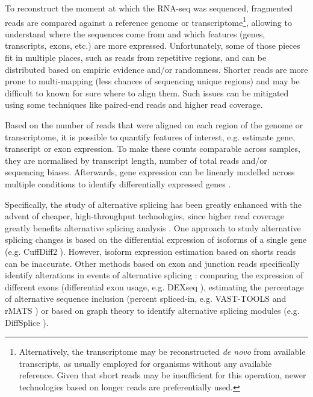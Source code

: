 To reconstruct the moment at which the RNA-seq was sequenced, fragmented reads are compared against a reference genome or transcriptome\footnote{Alternatively, the transcriptome may be reconstructed \emph{de novo} from available transcripts, as usually employed for organisms without any available reference. Given that short reads may be insufficient for this operation, newer technologies based on longer reads are preferentially used.}, allowing to understand where the sequences come from and which features (genes, transcripts, exons, etc.) are more expressed. Unfortunately, some of those pieces fit in multiple places, such as reads from repetitive regions, and can be distributed based on empiric evidence and/or randomness. Shorter reads are more prone to multi-mapping (less chances of sequencing unique regions) and may be difficult to known for sure where to align them. Such issues can be mitigated using some techniques like paired-end reads and higher read coverage.

Based on the number of reads that were aligned on each region of the genome or transcriptome, it is possible to quantify features of interest, e.g. estimate gene, transcript or exon expression. To make these counts comparable across samples, they are normalised by transcript length, number of total reads and/or sequencing biases. Afterwards, gene expression can be linearly modelled across multiple conditions to identify differentially expressed genes \cite{conesa:2016vw}.

Specifically, the study of alternative splicing has been greatly enhanced with the advent of cheaper, high-throughput technologies, since higher read coverage greatly benefits alternative splicing analysis \cite{}. %
One approach to study alternative splicing changes is based on the differential expression of isoforms of a single gene (e.g. CuffDiff2 \cite{trapnell:2013uv}). However, isoform expression estimation based on shorts reads can be inaccurate. %
 Other methods based on exon and junction reads specifically identify alterations in events of alternative splicing \cite{conesa:2016vw}: comparing the expression of different exons (differential exon usage, e.g. DEXseq \cite{li:2015tn}), estimating the percentage of alternative sequence inclusion (percent spliced-in, e.g. VAST-TOOLS \cite{irimia:2014wt,tapial:2017ui} and rMATS \cite{shen:2014tk}) or based on graph theory to identify alternative splicing modules (e.g. DiffSplice \cite{hu:2012uw}).

